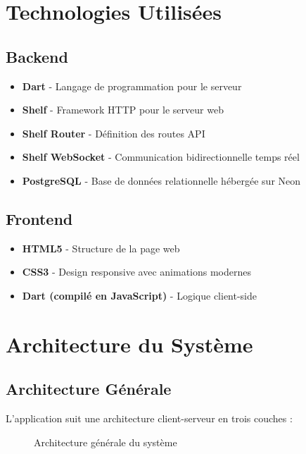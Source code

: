 \documentclass{article}
\begin{document}
\clearpage
\section{Technologies Utilisées}

\subsection{Backend}

\begin{itemize}
    \item \textbf{Dart} - Langage de programmation pour le serveur
    \item \textbf{Shelf} - Framework HTTP pour le serveur web
    \item \textbf{Shelf Router} - Définition des routes API
    \item \textbf{Shelf WebSocket} - Communication bidirectionnelle temps réel
    \item \textbf{PostgreSQL} - Base de données relationnelle hébergée sur Neon
\end{itemize}

\subsection{Frontend}

\begin{itemize}
    \item \textbf{HTML5} - Structure de la page web
    \item \textbf{CSS3} - Design responsive avec animations modernes
    \item \textbf{Dart (compilé en JavaScript)} - Logique client-side
\end{itemize}

\clearpage
\section{Architecture du Système}

\subsection{Architecture Générale}

L'application suit une architecture client-serveur en trois couches :

\begin{figure}[H]
    \centering
    \caption{Architecture générale du système}
\end{figure}
\end{document}

